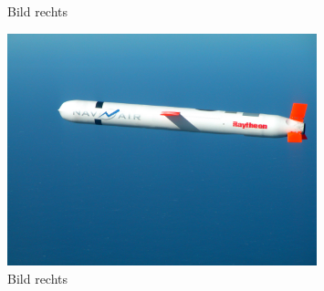 \documentclass[10pt,a4paper,oneside]{beamer}
\begin{document}
\begin{frame}
\begin{figure}[htbp]
\begin{minipage}{0.3\textwidth}
        \caption{Bild rechts}
      \end{minipage}\hfill
      \begin{minipage}{0.3\textwidth}
       \centering
        \includegraphics[width=0.8\textwidth]{images/cruise_missle.jpg}
        \caption{Bild rechts}
      \end{minipage}
    \end{figure}
\end{frame}
\end{document}
